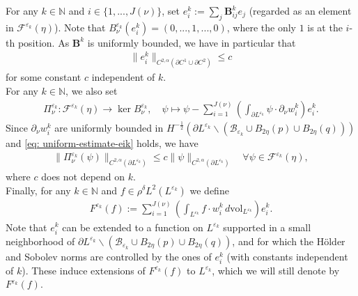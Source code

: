 \documentclass[11pt]{amsart}
\theoremstyle{definition}
\theoremstyle{remark}
\newcommand{\vol}{\mathrm{vol}}
\begin{document}
For any $k\in \mathbb{N}$ and $i\in \{1,..., J(\nu)\}$, set $e_i^k:=\sum_j\mathbf{B}_{ij}^ke_j$ (regarded as an element in $\mathscr{F}^{\varepsilon_k}(\eta)$). Note that
    $B_\nu^{\varepsilon_k}(e_i^k)= (0,...,1,...,0)$, where the only $1$ is at the $i$-th position.
As $\mathbf{B}^k$ is uniformly bounded, we have in particular that
\begin{align}\label{eq: uniform-estimate-eik}
    \lVert e_i^k\rVert_{C^{2,\alpha}( \partial C^1\cup \partial C^2)}\leq c
\end{align}
for some constant $c$ independent of $k$.\\
For any $k\in \mathbb{N}$, we also set
\begin{align}\label{eq: epsilon-projection}
    \Pi_\nu^{\varepsilon_k}: \mathscr{F}^{\varepsilon_k}(\eta)\to \ker B_\nu^{\varepsilon_k},\quad \psi\mapsto \psi-\sum_{i=1}^{J(\nu)}\left(\int_{\partial L^{\varepsilon_k}}\psi\cdot \partial_\nu w_i^k\right)e_i^k.
\end{align}
Since $\partial_\nu w_i^k$ are uniformly bounded in $H^{-\frac{1}{2}}(\partial L^{\varepsilon_k}\smallsetminus (\mathscr{B}_{\varepsilon_k}\cup B_{2\eta}(p)\cup B_{2\eta}(q)))$ and \eqref{eq: uniform-estimate-eik} holds, we have
\begin{align}
\label{eq: holder-bound-bdry}
    \lVert \Pi_\nu^{\varepsilon_k}(\psi)\rVert_{C^{2,\alpha}( \partial L^{\varepsilon_k})}\leq c\lVert \psi\rVert_{C^{2,\alpha}(\partial L^{\varepsilon_k})}\quad \forall \psi\in \mathscr{F}^{\varepsilon_k}(\eta),
\end{align}
where $c$ does not depend on $k$.\\
Finally, for any $k\in \mathbb{N}$ and $f\in \rho^{\delta}L^2(L^{\varepsilon_k})$ we define
\begin{align*}
    F^{\varepsilon_k}(f):=\sum_{i=1}^{J(\nu)}\left(\int_{L^{\varepsilon_k}}f\cdot w_i^k\, d\vol_{L^{\varepsilon_k}}\right)e_i^k.
\end{align*}
Note that $e_i^k$ can be extended to a function on $L^{\varepsilon_k}$ supported in a small neighborhood of $\partial L^{\varepsilon_k}\smallsetminus(\mathscr{B}_{\varepsilon_k}\cup B_{2\eta}(p)\cup B_{2\eta}(q))$, and for which the H\"older and Sobolev norms are controlled by the ones of $e_i^k$ (with constants independent of $k$). These induce extensions of $F^{\varepsilon_k}(f)$ to $L^{\varepsilon_k}$, which we will still denote by $F^{\varepsilon_k}(f)$.
\end{document}
